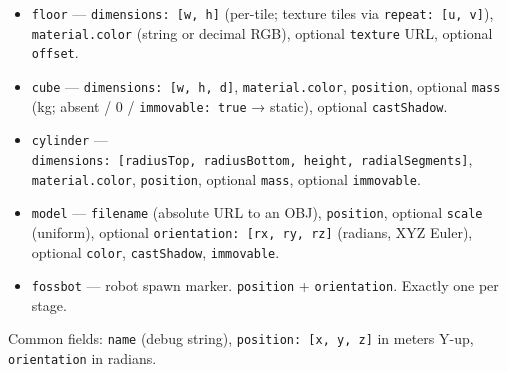 \documentclass[
]{article}
\providecommand{\tightlist}{%
  \setlength{\itemsep}{0pt}\setlength{\parskip}{0pt}}
\begin{document}
\begin{itemize}
\tightlist
\item
  \texttt{floor} --- \texttt{dimensions:\ {[}w,\ h{]}} (per-tile;
  texture tiles via \texttt{repeat:\ {[}u,\ v{]}}),
  \texttt{material.color} (string or decimal RGB), optional
  \texttt{texture} URL, optional \texttt{offset}.
\item
  \texttt{cube} --- \texttt{dimensions:\ {[}w,\ h,\ d{]}},
  \texttt{material.color}, \texttt{position}, optional \texttt{mass}
  (kg; absent / 0 / \texttt{immovable:\ true} → static), optional
  \texttt{castShadow}.
\item
  \texttt{cylinder} ---
  \texttt{dimensions:\ {[}radiusTop,\ radiusBottom,\ height,\ radialSegments{]}},
  \texttt{material.color}, \texttt{position}, optional \texttt{mass},
  optional \texttt{immovable}.
\item
  \texttt{model} --- \texttt{filename} (absolute URL to an OBJ),
  \texttt{position}, optional \texttt{scale} (uniform), optional
  \texttt{orientation:\ {[}rx,\ ry,\ rz{]}} (radians, XYZ Euler),
  optional \texttt{color}, \texttt{castShadow}, \texttt{immovable}.
\item
  \texttt{fossbot} --- robot spawn marker. \texttt{position} +
  \texttt{orientation}. Exactly one per stage.
\end{itemize}

Common fields: \texttt{name} (debug string),
\texttt{position:\ {[}x,\ y,\ z{]}} in meters Y-up, \texttt{orientation}
in radians.
\end{document}

